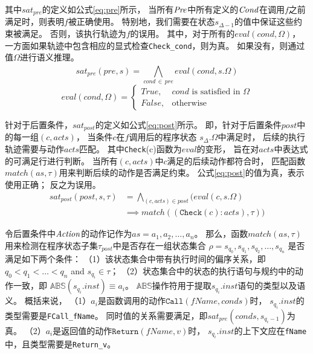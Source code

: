 其中$sat_{pre}$的定义如公式\ref{eq:pre}所示，
当所有$\mathit{Pre}$中所有定义的$\mathit{Cond}$在调用$f$之前满足时，则表明$f$被正确使用。
特别地，我们需要在状态$s_{\Delta-1}$的值中保证这些约束被满足。
否则，该执行轨迹为$f$的误用。
其中，对于所有的$eval(cond, \Omega)$，
一方面如果轨迹中包含相应的显式检查\texttt{Check\_cond}，则为真。
如果没有，则通过值$\Omega$进行语义推理。
\begin{equation}
\label{eq:pre}
sat_{pre}(\mathit{pre}, s) = \bigwedge_{cond\,\in\,\mathit{pre}}^{} eval(cond, s.\Omega)
\end{equation}
\begin{equation}
\label{eq:eval}
eval(\mathit{cond}, \Omega) = 
\begin{cases}
True, & \text{$\mathit{cond}$ is satisfied in $\Omega$}\\
False,              & \text{otherwise}
\end{cases}
\end{equation}


针对于后置条件，$sat_{post}$的定义如公式\ref{eq:post}所示。
即，针对于后置条件$\mathit{post}$中的每一组$(c,\mathit{acts})$，
当条件$c$在$f$调用后的程序状态 $s_{\Delta}.\Omega$中满足时，
后续的执行轨迹需要与动作$\mathit{acts}$匹配。
其中\texttt{Check}(c)函数为$eval$的变形，
旨在对$\mathit{acts}$中表达式的可满足行进行判断。
当所有$(c,\mathit{acts})$中$c$满足的后续动作都符合时，
匹配函数$\mathit{match}(\mathit{as}, \tau)$用来判断后续的动作是否满足约束。
公式\ref{eq:post}的值为真，表示使用正确；
反之为误用。
\begin{align}
\label{eq:post}
sat_{post}(\mathit{post},s,\tau) &=  \bigwedge_{(c,acts) \in \mathit{post}}^{} 
\Big( eval(\mathit{c},s.\Omega) \nonumber \\
& \implies
match((\texttt{Check}(c):acts), \tau) \Big)
\end{align}

令后置条件中$\mathit{Action}$的动作记作为$\mathit{as} = a_1, a_2, \dots,a_n$。
那么，函数$\mathit{match}(\mathit{as}, \tau)$
用来检测在程序状态子集$\tau_{post}$中是否存在一组状态集合
$\rho = s_{q_0}, s_{q_1}, s_{q_2}, \dots,s_{q_n}$
是否满足如下两个条件：
（1）该状态集合中带有执行时间的偏序关系，即
$q_0 < q_1 < \ldots < q_n$ and $s_{q_i}\in\tau$；
（2）状态集合中的状态的执行语句与规约中的动作一致，即
$\mathbb{ABS}(s_{q_i}.inst) \equiv a_i$。
$\mathbb{ABS}$操作符用于提取$s_{q_i}.inst$语句的类型以及语义。
概括来说，
（1）$a_i$是函数调用的动作$\texttt{Call}(\mathit{fName},\mathit{conds})$时，
$s_{q_i}.inst$的类型需要是\texttt{FCall\_fName}。
同时值的关系需要满足，即$sat_{pre}(conds,s_{q_i-1})$为真。
（2）$a_i$是返回值的动作$\texttt{Return}(\mathit{fName},\mathit{v})$时，
$s_{q_i}.inst$的上下文应在\texttt{fName}中，且类型需要是\texttt{Return\_v}。




